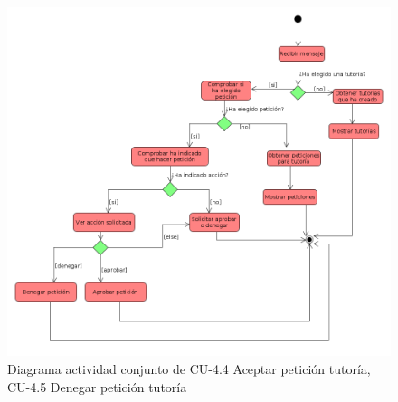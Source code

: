         \begin{figure}[H] %
\centering
\includegraphics[scale=0.3]{imagenes/diagramas/actividad/aprobar_denegar_peticiones.png}  %

\caption{Diagrama actividad conjunto de CU-4.4 Aceptar petición tutoría, CU-4.5 Denegar petición tutoría}\label{figura144}
\end{figure}

